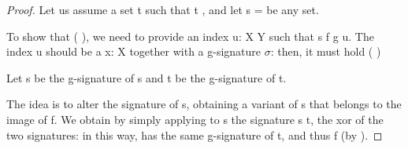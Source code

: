 \begin{proof}
% 
  Let us assume a set \var t such that \var t \AIN {}, and let \var s =  \coqdocvar{\_} \coqdocvar{\_}    be any set.
% 

  
  To show that  \AIN (  ), we need to provide an index \var u:  \var X \var Y such that \var s \EQX {} \var f \var g \var u. The index \var u should be a \var x: \var X together with a \var g-signature $\sigma$: then, it must hold  \coqdocvar{\_} \coqdocvar{\_}    \EQX {} \coqdocvar{\_} \coqdocvar{\_} ( \AXOR {}  \sig{})  

  \newcommand\stilde{\var{$\tilde s$}}
  Let \sig s be the \var g-signature of \var s and \sig t be the \var g-signature of \var t.

  The idea is to alter the signature of \var s, obtaining a variant \stilde{} of \var s that belongs to the image of \var f. We obtain \stilde{} by simply applying to \var s the signature \sig s \XORP \sig t, the xor of the two signatures: in this way, \stilde{} has the same \var g-signature of \var t, and thus \AIN \var f (by ). 

\end{proof}



